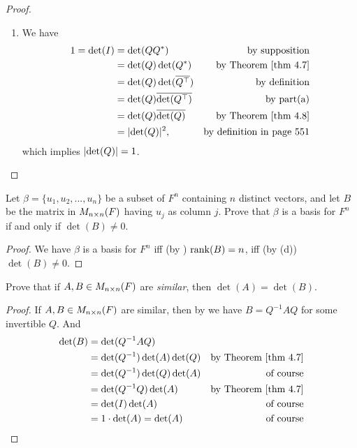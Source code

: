 \begin{proof}
\begin{enumerate}
\item We have
\begin{align*}
    1 = \det(I) & = \det(QQ^*) & \text{by supposition} \\
                & = \det(Q) \det(Q^*) & \text{by \THM{4.7}} \\
                & = \det(Q) \det(\conjugatet{Q^\top}) & \text{by definition} \\
                & = \det(Q) \conjugatet{\det(Q^\top)} & \text{by part(a)} \\
                & = \det(Q) \conjugatet{\det(Q)} & \text{by \THM{4.8}} \\
                & = \abs{\det(Q)}^2, & \text{by definition in page 551}
\end{align*}
which implies \(\lvert\det(Q)\rvert = 1\).
\end{enumerate}
\end{proof}

\begin{exercise} \label{exercise 4.3.14}
Let \(\beta = \{ u_1, u_2, ..., u_n \}\) be a subset of \(F^n\) containing \(n\) distinct vectors, and let \(B\) be the matrix in \(M_{n \times n}(F)\) having \(u_j\) as column \(j\).
Prove that \(\beta\) is a basis for \(F^n\) if and only if \(\det(B) \ne 0\).
\end{exercise}

\begin{proof}
We have \(\beta\) is a basis for \(F^n\) iff (by ) \(\mathrm{rank}(B) = n\), iff (by (d)) \(\det(B) \ne 0\).
\end{proof}

\begin{exercise} \label{exercise 4.3.15}
Prove that if \(A, B \in M_{n \times n}(F)\) are \emph{similar}, then \(\det(A) = \det(B)\).
\end{exercise}

\begin{proof}
If \(A, B \in M_{n \times n}(F)\) are similar, then by  we have \(B = Q^{-1} A Q\) for some invertible \(Q\).
And
\begin{align*}
    \det(B) & = \det(Q^{-1} A Q) \\
            & = \det(Q^{-1}) \det(A) \det(Q) & \text{by \THM{4.7}} \\
            & = \det(Q^{-1}) \det(Q) \det(A) & \text{of course} \\
            & = \det(Q^{-1} Q) \det(A) & \text{by \THM{4.7}} \\
            & = \det(I) \det(A) & \text{of course} \\
            & = 1 \cdot \det(A) = \det(A) & \text{of course}
\end{align*}
\end{proof}

